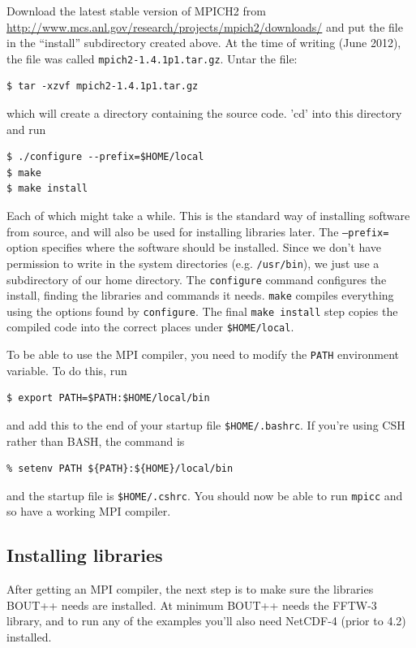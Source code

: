 \documentclass[12pt]{article}
\begin{document}
Download the latest stable version of MPICH2 from \url{http://www.mcs.anl.gov/research/projects/mpich2/downloads/} and put the file in the ``install'' subdirectory created above. At the time of writing (June 2012), the file was
called \texttt{mpich2-1.4.1p1.tar.gz}. Untar the file:
\begin{verbatim}
$ tar -xzvf mpich2-1.4.1p1.tar.gz
\end{verbatim}
which will create a directory containing the source code. 'cd' into this directory and run
\begin{verbatim}
$ ./configure --prefix=$HOME/local
$ make
$ make install
\end{verbatim}
Each of which might take a while. This is the standard way of installing software from source, and will also be used for installing libraries later. The \texttt{--prefix=} option specifies
where the software should be installed. Since we don't have permission
to write in the system directories (e.g. \texttt{/usr/bin}), we just use a subdirectory of our home directory. The \texttt{configure} command configures the
install, finding the libraries and commands it needs. \texttt{make} compiles everything using the options found by \texttt{configure}. The final \texttt{make install} step copies the compiled code into the correct places under \texttt{\$HOME/local}.

To be able to use the MPI compiler, you need to modify the \texttt{PATH}
environment variable. To do this, run
\begin{verbatim}
$ export PATH=$PATH:$HOME/local/bin
\end{verbatim}
and add this to the end of your startup file \texttt{\$HOME/.bashrc}. If you're using CSH rather than BASH, the command is
\begin{verbatim}
% setenv PATH ${PATH}:${HOME}/local/bin
\end{verbatim}
and the startup file is \texttt{\$HOME/.cshrc}. You should now be able to run
\texttt{mpicc} and so have a working MPI compiler.

\subsection{Installing libraries}
\label{sec:libraries}

After getting an MPI compiler, the next step is to make sure the
libraries BOUT++ needs are installed. At minimum BOUT++ needs the FFTW-3
library, and to run any of the examples you'll also need NetCDF-4 (prior to 4.2) installed.
\end{document}
